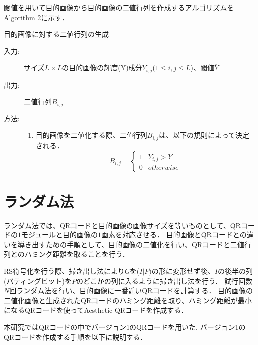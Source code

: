 \documentclass{thesis}
\begin{document}
閾値を用いて目的画像から目的画像の二値行列を作成するアルゴリズムをAlgorithm 2に示す．

\begin{algorithm}                      
\caption{目的画像に対する二値行列の生成}         
\label{alg:alg2} 
\begin{description}
\item[入力:] サイズ$L \times L$の目的画像の輝度(Y)成分$Y_{i,j}$($1 \leq i,j \leq L$)、閾値$\overline{Y}$
\item[出力:] 二値行列$B_{i,j}$
\item[方法:]
\begin{enumerate}
\item 目的画像を二値化する際、二値行列$B_{i,j}$は、以下の規則によって決定される．
\begin{equation}
{B_{i,j} =}
\begin{cases}
1 & Y_{i,j} > \overline{Y} \\
0 & otherwise 
\end{cases}
\label{eq:binary}
\end{equation}
\end{enumerate}
\end{description}
\end{algorithm} 



\newpage
\section{ランダム法}

ランダム法では、QRコードと目的画像の画像サイズを等いものとして、QRコードの$1$モジュールと目的画像の$1$画素を対応させる．
目的画像とQRコードとの違いを導き出すための手順として、目的画像の二値化を行い、QRコードと二値行列とのハミング距離を取ることを行う．

RS符号化を行う際、掃き出し法により$G$を($I|P)$の形に変形せず後、$I$の後半の列(パティングビット)を$P$のどこかの列に入るように掃き出し法を行う．
試行回数$N$回ランダム法を行い、目的画像に一番近いQRコードを計算する．
目的画像の二値化画像と生成されたQRコードのハミング距離を取り、ハミング距離が最小になるQRコードを使ってAesthetic QRコードを作成する．

\newpage
本研究ではQRコードの中でバージョン1のQRコードを用いた.
バージョン1のQRコードを作成する手順を以下に説明する．
\end{document}
